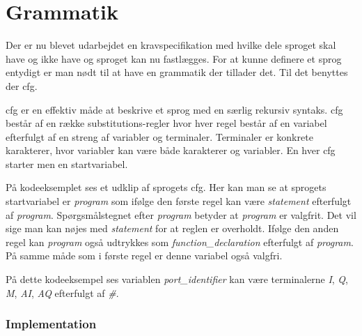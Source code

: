 \section{Grammatik}\label{sec:Gramatik}

Der er nu blevet udarbejdet en kravspecifikation med hvilke dele sproget skal have og ikke have og sproget kan nu fastlægges. For at kunne definere et sprog entydigt er man nødt til at have en grammatik der tillader det. Til det benyttes der \gls{cfg}.

\gls{cfg} er en effektiv måde at beskrive et sprog med en særlig rekursiv syntaks. \gls{cfg} består af en række substitutions-regler hvor hver regel består af en variabel efterfulgt af en streng af variabler og terminaler. Terminaler er konkrete karakterer, hvor variabler kan være både karakterer og variabler. En hver \gls{cfg} starter men en startvariabel.

På kodeeksemplet ses et udklip af sprogets \gls{cfg}. Her kan man se at sprogets startvariabel er \textit{program} som ifølge den første regel kan være \textit{statement} efterfulgt af \textit{program}. Spørgsmålstegnet efter \textit{program} betyder at \textit{program} er valgfrit. Det vil sige man kan nøjes med \textit{statement} for at reglen er overholdt. Ifølge den anden regel kan \textit{program} også udtrykkes som \textit{function\_declaration} efterfulgt af \textit{program}. På samme måde som i første regel er denne variabel også valgfri.


\noindent På dette kodeeksempel ses variablen \textit{port\_identifier} kan være terminalerne \textit{I}, \textit{Q}, \textit{M}, \textit{AI}, \textit{AQ} efterfulgt af \textit{\#}.

\subsubsection{Implementation}
